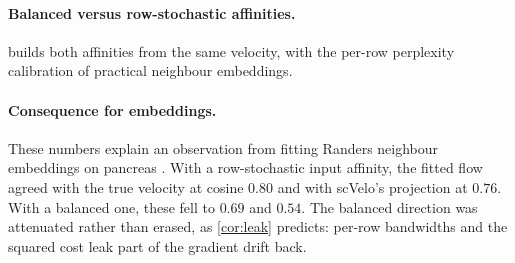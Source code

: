 \paragraph{Balanced versus row-stochastic affinities.}
 builds both affinities from the same velocity, with the
per-row perplexity calibration of practical neighbour embeddings.


\paragraph{Consequence for embeddings.}
These numbers explain an observation from fitting Randers neighbour
embeddings on pancreas \citep{bastidasponce2019comprehensive}. With a
row-stochastic input affinity, the fitted flow agreed with the true
velocity at cosine $0.80$ and with scVelo's projection at $0.76$. With a
balanced one, these fell to $0.69$ and $0.54$. The balanced direction was
attenuated rather than erased, as \cref{cor:leak} predicts: per-row
bandwidths and the squared cost leak part of the gradient drift back.
